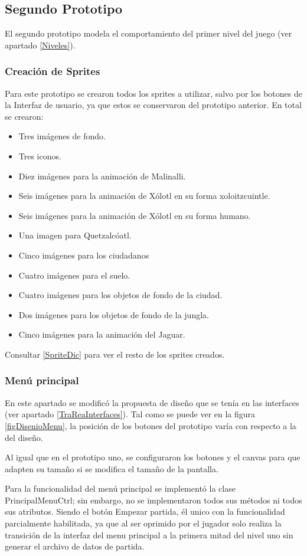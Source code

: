 \subsection{Segundo Prototipo}
El segundo prototipo modela el comportamiento del primer nivel del juego (ver 
apartado \ref{Niveles}). 

\subsubsection{Creación de Sprites}
Para este prototipo se crearon todos los sprites a utilizar, salvo por los botones 
de la Interfaz de usuario, ya que estos se conservaron del prototipo anterior. En 
total se crearon:
\begin{itemize}
	\item Tres imágenes de fondo.
	\item Tres iconos.
	\item Diez imágenes para la animación de Malinalli.
	\item Seis imágenes para la animación de Xólotl en su forma xoloitzcuintle.
	\item Seis imágenes para la animación de Xólotl en su forma humano.
	\item Una imagen para Quetzalcóatl.
	\item Cinco imágenes para los ciudadanos
	\item Cuatro imágenes para el suelo.
	\item Cuatro imágenes para los objetos de fondo de la ciudad.
	\item Dos imágenes para los objetos de fondo de la jungla.
	\item Cinco imágenes para la animación del Jaguar.
\end{itemize}  
Consultar \ref{SpriteDic} para ver el resto de los sprites creados.

\subsubsection{Menú principal}
En este apartado se modificó la propuesta de diseño que se tenía en las interfaces 
(ver apartado \ref{TraReaInterfaces}). Tal como se puede ver en la figura 
\ref{figDisenioMenu}, la posición de los botones del prototipo varía con 
respecto a la del diseño. 
\\
\par
Al igual que en el prototipo uno, se configuraron los botones y el 
canvas para que adapten su tamaño si se modifica el tamaño de la 
pantalla.
\\
\par
Para la funcionalidad del menú principal se implementó la clase PrincipalMenuCtrl; 
sin embargo, no se implementaron todos sus métodos ni todos sus atributos. Siendo 
el botón Empezar partida, él unico con la funcionalidad parcialmente habilitada, 
ya que al ser oprimido por el jugador solo realiza la transición de la interfaz del 
menu principal a la primera mitad del nivel uno sin generar el archivo de datos 
de partida.
\\
\par

